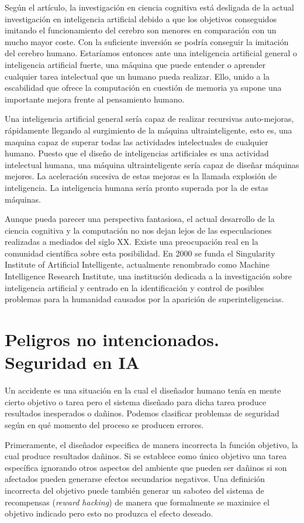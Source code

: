 \documentclass[12pt,a4paper]{article}
\begin{document}
Según el artículo, la investigación en ciencia cognitiva está desligada de la actual investigación en inteligencia artificial debido a que los objetivos conseguidos imitando el funcionamiento del cerebro son menores en comparación con un mucho mayor coste. Con la suficiente inversión se podría conseguir la imitación del cerebro humano. Estaríamos entonces ante una inteligencia artificial general o inteligencia artificial fuerte, una máquina que puede entender o aprender cualquier tarea intelectual que un humano pueda realizar. Ello, unido a la escabilidad que ofrece la computación en cuestión de memoria ya supone una importante mejora frente al pensamiento humano.

Una inteligencia artificial general sería capaz de realizar recursivas auto-mejoras, rápidamente llegando al surgimiento de la máquina ultrainteligente, esto es, una maquina capaz de superar todas las actividades intelectuales de cualquier humano. Puesto que el diseño de inteligencias artificiales es una actividad intelectual humana, una máquina ultrainteligente sería capaz de diseñar máquinas mejores. La aceleración sucesiva de estas mejoras es la llamada explosión de inteligencia. La inteligencia humana sería pronto superada por la de estas máquinas.

Aunque pueda parecer una perspectiva fantasiosa, el actual desarrollo de la ciencia cognitiva y la computación no nos dejan lejos de las especulaciones realizadas a mediados del siglo XX. Existe una preocupación real en la comunidad científica sobre esta posibilidad. En 2000 se funda el Singularity Institute of Artificial Intelligente, actualmente renombrado como Machine Intelligence Research Institute, una institución dedicada a la investigación sobre inteligencia artificial y centrado en la identificación y control de posibles problemas para la humanidad causados por la aparición de superinteligencias.

\section{Peligros no intencionados. Seguridad en IA}

Un accidente es una situación en la cual el diseñador humano tenía en mente cierto objetivo o tarea pero el sistema diseñado para dicha tarea produce resultados inesperados o dañinos. Podemos clasificar problemas de seguridad según en qué momento del proceso se producen errores.

Primeramente, el diseñador especifica de manera incorrecta la función objetivo, la cual produce resultados dañinos. Si se establece como único objetivo una tarea específica ignorando otros aspectos del ambiente que pueden ser dañinos si son afectados pueden generarse efectos secundarios negativos. Una definición incorrecta del objetivo puede también generar un saboteo del sistema de recompensas (\emph{reward hacking}) de manera que formalmente se maximice el objetivo indicado pero esto no produzca el efecto deseado.
\end{document}
